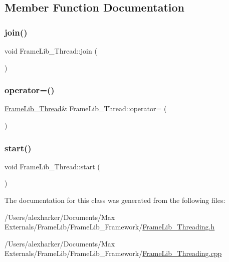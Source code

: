 \subsection{Member Function Documentation}
\mbox{\label{class_frame_lib___thread_ac316111ade61b8b4aea13d7a3f8d21a3}} 
\subsubsection{\texorpdfstring{join()}{join()}}
{\footnotesize\ttfamily void Frame\+Lib\+\_\+\+Thread\+::join (\begin{DoxyParamCaption}{ }\end{DoxyParamCaption})}

\mbox{\label{class_frame_lib___thread_af6a6b8a2ae2b38eb9629871ef3c40e01}} 
\subsubsection{\texorpdfstring{operator=()}{operator=()}}
{\footnotesize\ttfamily \hyperlink{class_frame_lib___thread}{Frame\+Lib\+\_\+\+Thread}\& Frame\+Lib\+\_\+\+Thread\+::operator= (\begin{DoxyParamCaption}\item[{const \hyperlink{class_frame_lib___thread}{Frame\+Lib\+\_\+\+Thread} \&}]{ }\end{DoxyParamCaption})\hspace{0.3cm}{\ttfamily [delete]}}

\mbox{\label{class_frame_lib___thread_a5b6dbb96372355e02fb81753638b6102}} 
\subsubsection{\texorpdfstring{start()}{start()}}
{\footnotesize\ttfamily void Frame\+Lib\+\_\+\+Thread\+::start (\begin{DoxyParamCaption}{ }\end{DoxyParamCaption})}



The documentation for this class was generated from the following files\+:\begin{DoxyCompactItemize}
\item 
/\+Users/alexharker/\+Documents/\+Max Externals/\+Frame\+Lib/\+Frame\+Lib\+\_\+\+Framework/\hyperlink{_frame_lib___threading_8h}{Frame\+Lib\+\_\+\+Threading.\+h}\item 
/\+Users/alexharker/\+Documents/\+Max Externals/\+Frame\+Lib/\+Frame\+Lib\+\_\+\+Framework/\hyperlink{_frame_lib___threading_8cpp}{Frame\+Lib\+\_\+\+Threading.\+cpp}\end{DoxyCompactItemize}
